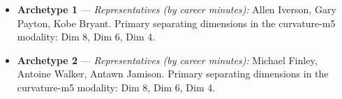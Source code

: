 \begin{itemize}
\item \textbf{Archetype 1} --- \emph{Representatives (by career minutes):} Allen Iverson, Gary Payton, Kobe Bryant. Primary separating dimensions in the curvature-m5 modality: Dim 8, Dim 6, Dim 4.
\item \textbf{Archetype 2} --- \emph{Representatives (by career minutes):} Michael Finley, Antoine Walker, Antawn Jamison. Primary separating dimensions in the curvature-m5 modality: Dim 8, Dim 6, Dim 4.
\end{itemize}
